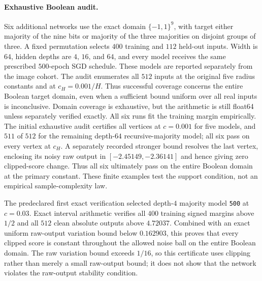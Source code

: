 
\paragraph{Exhaustive Boolean audit.}
Six additional networks use the exact domain $\{-1,1\}^9$, with target
either majority of the nine bits or majority of the three majorities
on disjoint groups of three. A fixed permutation selects $400$ training
and $112$ held-out inputs. Width is $64$, hidden depths are $4$, $16$,
and $64$, and every model receives the same prescribed $500$-epoch SGD
schedule. These models are reported separately from the image cohort.
The audit enumerates all $512$ inputs at the original five radius
constants and at $c_H=0.001/H$. Thus successful coverage concerns the
entire Boolean target domain, even when a sufficient bound uniform over
all real inputs is inconclusive. Domain coverage is exhaustive, but
the arithmetic is still float64 unless separately verified exactly.
All six runs fit the training margin empirically. The initial exhaustive
audit certifies all vertices at $c=0.001$ for five models, and $511$ of
$512$ for the remaining depth-$64$ recursive-majority model; all six
pass on every vertex at $c_H$. A separately recorded stronger bound
resolves the last vertex, enclosing its noisy raw output in
$[-2.45149,-2.36141]$ and hence giving zero clipped-score change.
Thus all six ultimately pass on the entire Boolean domain at the
primary constant. These finite examples test the support condition, not an
empirical sample-complexity law.

The predeclared first exact verification selected depth-$4$ majority
model \texttt{500} at $c=0.03$. Exact interval arithmetic verifies all
$400$ training signed margins above $1/2$ and all $512$ clean absolute
outputs above $4.72037$. Combined with an exact uniform raw-output
variation bound below $0.162903$, this proves that every clipped score
is constant throughout the allowed noise ball on the entire Boolean
domain. The raw variation bound exceeds $1/16$, so this certificate
uses clipping rather than merely a small raw-output bound; it does not
show that the network violates the raw-output stability condition.

